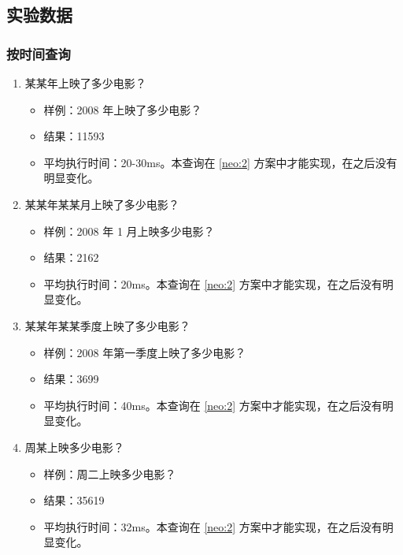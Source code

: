 \documentclass{ctexrep}
\begin{document}
	\subsection{实验数据}
	\subsubsection{按时间查询}
	\begin{enumerate}
		\item 某某年上映了多少电影？\begin{itemize}
			\item 样例：2008 年上映了多少电影？
			\item 结果：11593
			\item 平均执行时间：20-30ms。本查询在 \ref{neo:2} 方案中才能实现，在之后没有明显变化。
		\end{itemize}
		\item 某某年某某月上映了多少电影？\begin{itemize}
			\item 样例：2008 年 1 月上映多少电影？
			\item 结果：2162
			\item 平均执行时间：20ms。本查询在 \ref{neo:2} 方案中才能实现，在之后没有明显变化。
		\end{itemize}
		\item 某某年某某季度上映了多少电影？\begin{itemize}
			\item 样例：2008 年第一季度上映了多少电影？
			\item 结果：3699
			\item 平均执行时间：40ms。本查询在 \ref{neo:2} 方案中才能实现，在之后没有明显变化。
		\end{itemize}
		\item 周某上映多少电影？\begin{itemize}
			\item 样例：周二上映多少电影？
			\item 结果：35619
			\item 平均执行时间：32ms。本查询在 \ref{neo:2} 方案中才能实现，在之后没有明显变化。
		\end{itemize}
	\end{enumerate}
\end{document}
